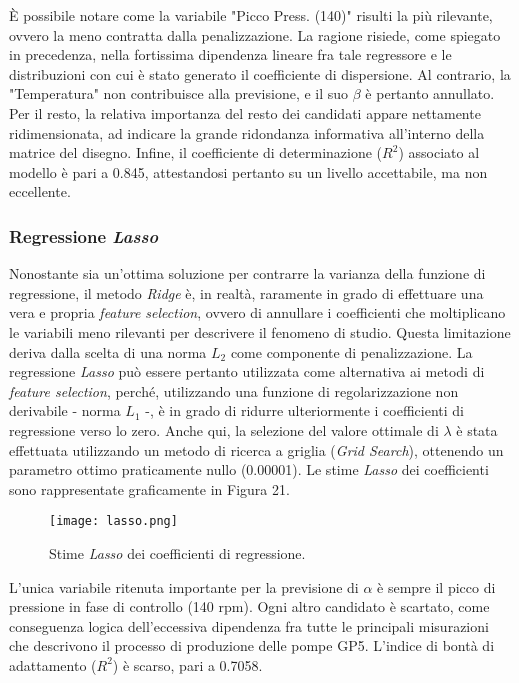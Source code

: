 \documentclass[fleqn,10pt]{SelfArx} %
\begin{document}
È possibile notare come la variabile "Picco Press. (140)" risulti la più rilevante, ovvero la meno contratta dalla penalizzazione. La ragione risiede, come spiegato in precedenza, nella fortissima dipendenza lineare fra tale regressore e le distribuzioni con cui è stato generato il coefficiente di dispersione. Al contrario, la "Temperatura" non contribuisce alla previsione, e il suo $\beta$ è pertanto annullato. Per il resto, la relativa importanza del resto dei candidati appare nettamente ridimensionata, ad indicare la grande ridondanza informativa all'interno della matrice del disegno. Infine, il coefficiente di determinazione ($R^2$) associato al modello è pari a 0.845, attestandosi pertanto su un livello accettabile, ma non eccellente.
\subsubsection{Regressione \textit{Lasso}}
Nonostante sia un'ottima soluzione per contrarre la varianza della funzione di regressione, il metodo \textit{Ridge} è, in realtà, raramente in grado di effettuare una vera e propria \textit{feature selection}, ovvero di annullare i coefficienti che moltiplicano le variabili meno rilevanti per descrivere il fenomeno di studio. Questa limitazione deriva dalla scelta di una norma $L_2$ come componente di penalizzazione. La regressione \textit{Lasso} \cite{Lasso} può essere pertanto utilizzata come alternativa ai metodi di \textit{feature selection}, perché, utilizzando una funzione di regolarizzazione non derivabile - norma $L_1$ -, è in grado di ridurre ulteriormente i coefficienti di regressione verso lo zero. Anche qui, la selezione del valore ottimale di $\lambda$ è stata effettuata utilizzando un metodo di ricerca a griglia (\textit{Grid Search}), ottenendo un parametro ottimo praticamente nullo (0.00001). Le stime \textit{Lasso} dei coefficienti sono rappresentate graficamente in Figura 21.
\begin{figure}[h]
    \centering
    \texttt{[image: lasso.png]}
    \label{fig:em}
    \caption{Stime \textit{Lasso} dei coefficienti di regressione.}
\end{figure}
L'unica variabile ritenuta importante per la previsione di $\alpha$ è sempre il picco di pressione in fase di controllo (140 rpm). Ogni altro candidato è scartato, come conseguenza logica dell'eccessiva dipendenza fra tutte le principali misurazioni che descrivono il processo di produzione delle pompe GP5. L'indice di bontà di adattamento ($R^2$) è scarso, pari a 0.7058.
\end{document}
